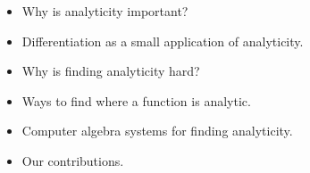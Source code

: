
\begin{itemize}
  \item Why is analyticity important?
  \item Differentiation as a small application of analyticity.
  \item Why is finding analyticity hard?
  \item Ways to find where a function is analytic.
  \item Computer algebra systems for finding analyticity.
  \item Our contributions.
\end{itemize}
